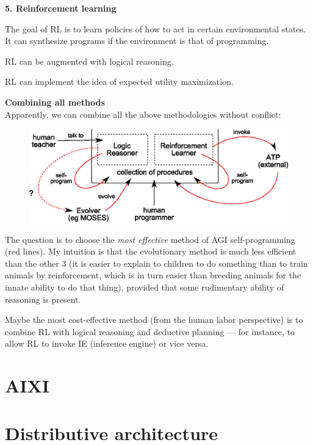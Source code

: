 \textbf{5. Reinforcement learning} 
\begin{compactenum}[(a)]
\item  The goal of RL is to learn policies of how to act in certain environmental states.  It can synthesize programs if the environment is that of programming.
\item  RL can be augmented with logical reasoning.
\item  RL can implement the idea of expected utility maximization.
\\
\end{compactenum}

\textbf{Combining all methods}\\
Apparently, we can combine all the above methodologies without conflict:
\begin{figure}[H]
\centering
\includegraphics{combined-architecture.eps}
\vspace{-0.5cm}
\end{figure}

The question is to choose the \textit{most effective} method of AGI self-programming (red lines).  My intuition is that the evolutionary method is much less efficient than the other 3 (it is easier to explain to children to do something than to train animals by reinforcement, which is in turn easier than breeding animals for the innate ability to do that thing), provided that some rudimentary ability of reasoning is present.

Maybe the most cost-effective method (from the human labor perspective) is to combine RL with logical reasoning and deductive planning --- for instance, to allow RL to invoke IE (inference engine) or vice versa.

\section{AIXI}

\section{Distributive architecture}
